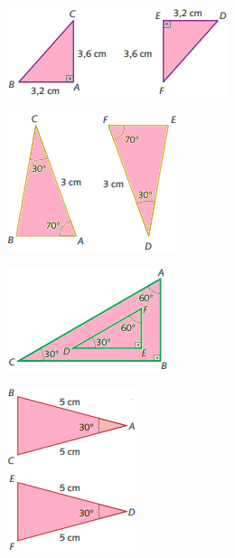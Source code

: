 \begin{multicols}{2}
\begin{escolha}
\item \includegraphics[width=.5\textwidth]{./imgSAEB_8_MAT/media/image19.png}


\item \includegraphics[width=.3\textwidth]{./imgSAEB_8_MAT/media/image20.png}


\item \includegraphics[width=.4\textwidth]{./imgSAEB_8_MAT/media/image21.png}


\item \includegraphics[width=.3\textwidth]{./imgSAEB_8_MAT/media/image22.png}

\end{escolha}
\end{multicols}

